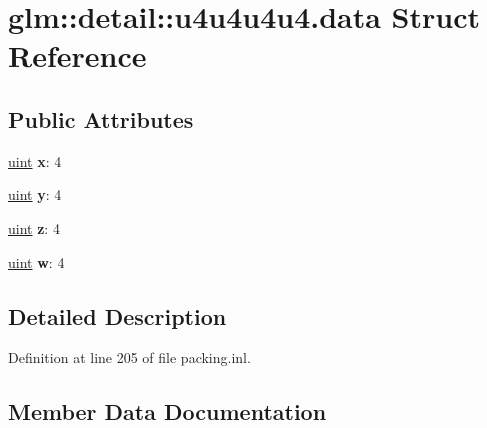 \hypertarget{structglm_1_1detail_1_1u4u4u4u4_8data}{}\section{glm\+:\+:detail\+:\+:u4u4u4u4.\+data Struct Reference}
\label{structglm_1_1detail_1_1u4u4u4u4_8data}
\subsection*{Public Attributes}
\begin{DoxyCompactItemize}
\item 
\mbox{\label{structglm_1_1detail_1_1u4u4u4u4_8data_a9dd4e461268c8034f5c8564e155c67a6}} 
\hyperlink{group__core__precision_ga4fd29415871152bfb5abd588334147c8}{uint} {\bfseries x}\+: 4
\item 
\mbox{\label{structglm_1_1detail_1_1u4u4u4u4_8data_a415290769594460e2e485922904f345d}} 
\hyperlink{group__core__precision_ga4fd29415871152bfb5abd588334147c8}{uint} {\bfseries y}\+: 4
\item 
\mbox{\label{structglm_1_1detail_1_1u4u4u4u4_8data_afbade9e36a3f36d3d676c1b808451dd7}} 
\hyperlink{group__core__precision_ga4fd29415871152bfb5abd588334147c8}{uint} {\bfseries z}\+: 4
\item 
\mbox{\label{structglm_1_1detail_1_1u4u4u4u4_8data_af1290186a5d0b1ceab27f4e77c0c5d68}} 
\hyperlink{group__core__precision_ga4fd29415871152bfb5abd588334147c8}{uint} {\bfseries w}\+: 4
\end{DoxyCompactItemize}


\subsection{Detailed Description}


Definition at line 205 of file packing.\+inl.



\subsection{Member Data Documentation}
\mbox{\label{structglm_1_1detail_1_1u4u4u4u4_8data_af1290186a5d0b1ceab27f4e77c0c5d68}} 
